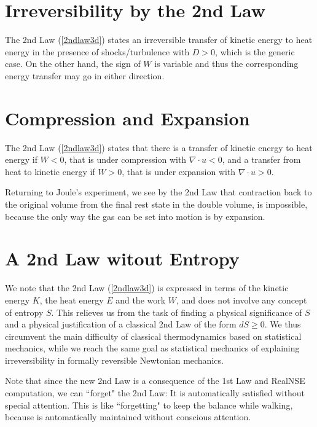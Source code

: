 \section{Irreversibility by the 2nd Law}

The 2nd Law (\ref{2ndlaw3d}) states an irreversible
transfer of kinetic energy to heat energy in the presence of  
shocks/turbulence with $D >0$, which is the generic case. 
On the other hand, the sign of $W$ is variable and
thus the corresponding energy transfer may go in either direction. 



\section{Compression and Expansion}

The 2nd Law (\ref{2ndlaw3d}) states that there is a transfer
of kinetic energy to heat energy if $W<0$, that is under compression
with $\nabla\cdot u<0$, and a transfer from heat to kinetic energy 
if $W>0$, that is under expansion with $\nabla\cdot u>0$. 

Returning to Joule's experiment, we see by the 2nd Law that contraction back
to the original volume from the final rest state in the double volume,
is impossible, because the only way the gas can be set into motion is 
by expansion.



 

\section{A 2nd Law witout Entropy}

We note that the 2nd Law (\ref{2ndlaw3d}) is expressed in terms of 
the kinetic energy $K$, the heat energy $E$ and the work $W$,
and does not involve any concept of entropy $S$. This relieves us from
the task of finding a physical significance of $S$ and 
a physical justification of a classical 2nd Law of the form $dS\ge 0$.
We thus circumvent the main difficulty of classical thermodynamics
based on statistical mechanics, while we reach the same goal 
as statistical mechanics
of explaining irreversibility in formally reversible Newtonian mechanics.

Note that since the new 2nd Law is a consequence of the 1st Law and
RealNSE computation, we can ``forget" the 2nd Law: It is automatically
satisfied without special attention. This is like ``forgetting"
to keep the balance while walking, because is automatically
maintained without conscious attention. 






